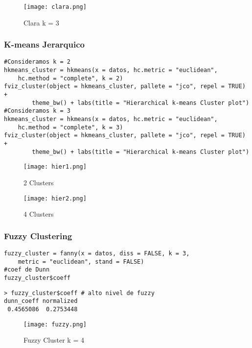 \documentclass[b4paper]{article}
\begin{document}
    \begin{figure}[h]
        \centering
        \texttt{[image: clara.png]}
        \caption{Clara k = 3}
    \end{figure}
    \subsubsection{K-means Jerarquico}
    \begin{tcolorbox}
        \begin{verbatim}
#Consideramos k = 2
hkmeans_cluster = hkmeans(x = datos, hc.metric = "euclidean",
    hc.method = "complete", k = 2)
fviz_cluster(object = hkmeans_cluster, pallete = "jco", repel = TRUE) +
        theme_bw() + labs(title = "Hierarchical k-means Cluster plot")
#Consideramos k = 3 
hkmeans_cluster = hkmeans(x = datos, hc.metric = "euclidean",
    hc.method = "complete", k = 3)
fviz_cluster(object = hkmeans_cluster, pallete = "jco", repel = TRUE) +
        theme_bw() + labs(title = "Hierarchical k-means Cluster plot")\end{verbatim}
    \end{tcolorbox}

    \begin{figure}[h]
        \begin{minipage}[c]{0.5\textwidth}
            \centering
                \texttt{[image: hier1.png]}
                \caption{2 Clusters}
        \end{minipage}
        \begin{minipage}[c]{0.5\textwidth}
            \centering
                \texttt{[image: hier2.png]}
                \caption{4 Clusters}
        \end{minipage}
    \end{figure}
    \subsubsection{Fuzzy Clustering}
    \begin{tcolorbox}[title = input]
        \begin{verbatim}
fuzzy_cluster = fanny(x = datos, diss = FALSE, k = 3,
    metric = "euclidean", stand = FALSE)
#coef de Dunn
fuzzy_cluster$coeff            
        \end{verbatim}
    \end{tcolorbox}
    \begin{tcolorbox}[title = output]
        \begin{verbatim}
> fuzzy_cluster$coeff # alto nivel de fuzzy
dunn_coeff normalized 
 0.4565086  0.2753448\end{verbatim}
    \end{tcolorbox}
    \begin{figure}[h]
        \centering
        \texttt{[image: fuzzy.png]}
        \caption{Fuzzy Cluster k = 4}
    \end{figure}
\end{document}
